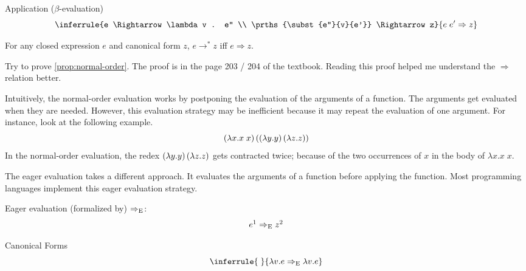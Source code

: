 \begin{enumcirc}
	Application ($\beta$-evaluation)
	\[
		\inferrule
		{e \Rightarrow \lambda v . e'' \\ \prths{\subst{e''}{v}{e'}} \Rightarrow z}
		{e \; e' \Rightarrow z}
	\]
	\begin{property} \label{prop:normal-order}
		For any closed expression $e$ and canonical form $z$,
		$e \rightarrow^* z$ iff $e \Rightarrow z$.
	\end{property}
	\begin{exercisetab}
		Try to prove \cref{prop:normal-order}.
		The proof is in the page 203 / 204 of the textbook.
		Reading this proof helped me understand the $\Rightarrow$ relation better.
	\end{exercisetab}
	\item
	Intuitively, the normal-order evaluation works by postponing the evaluation of
	the arguments of a function.
	The arguments get evaluated when they are needed.
	However, this evaluation strategy may be inefficient because it may repeat the
	evaluation of one argument.
	For instance, look at the following example.
	\[
		\left( \lambda x. x \; x \right)
		\left( 
			\left( \lambda y. y \right)
			\left( \lambda z. z \right)
		 \right)
	\]
	In the normal-order evaluation, the redex
	$\left( \lambda y. y \right) \left( \lambda z. z \right)$
	gets contracted twice; because of the two occurrences of $x$ in the body of
	$\lambda x. x \; x$.
	\item
	The eager evaluation takes a different approach.
	It evaluates the arguments of a function before applying the function.
	Most programming languages implement this eager evaluation strategy.
	\item
	Eager evaluation (formalized by) $\Rightarrow_{\textrm{E}}$:
	\[
		e\footnotemark \RightarrowE z\footnotemark
	\]

	Canonical Forms
	\[
		\inferrule{\;}{\lambda v. e \RightarrowE \lambda v. e}
	\]


\end{enumcirc}
